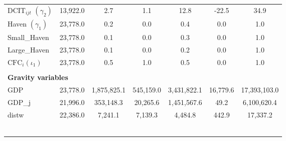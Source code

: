 \documentclass[twoside,a4paper,11pt]{article}
\begin{document}
\begin{minipage}{\linewidth}
{\begin{tabular}{lccc|ccc}
		$ \text{DCIT}_{ijt}$ $(\gamma_2)$ & 13,922.0 & 2.7 & 1.1 & 12.8 & -22.5 & 34.9 \\
		Haven $(\gamma_1)$ & 23,778.0 & 0.2 & 0.0 & 0.4 & 0.0 & 1.0 \\
		Small\_Haven & 23,778.0 & 0.1 & 0.0 & 0.3 & 0.0 & 1.0 \\
		Large\_Haven & 23,778.0 & 0.1 & 0.0 & 0.2 & 0.0 & 1.0 \\
		$\text{CFC}_i$$ (\iota_1)$ & 23,778.0 & 0.5 & 1.0 & 0.5 & 0.0 & 1.0 \\
		\vspace{2pt} & \begin{footnotesize}\end{footnotesize} & \begin{footnotesize}\end{footnotesize} & \begin{footnotesize}\end{footnotesize} & \begin{footnotesize}\end{footnotesize} & \begin{footnotesize}\end{footnotesize} & \begin{footnotesize}\end{footnotesize} \\
\multicolumn{7}{l}{\textbf{Gravity variables}} \\\hline
		GDP & 23,778.0 & 1,875,825.1 & 545,159.0 & 3,431,822.1 & 16,779.6 & 17,393,103.0 \\
		GDP\_j & 21,996.0 & 353,148.3 & 20,265.6 & 1,451,567.6 & 49.2 & 6,100,620.4 \\
		distw & 22,386.0 & 7,241.1 & 7,139.3 & 4,484.8 & 442.9 & 17,337.2 \\
		\vspace{2pt} & \begin{footnotesize}\end{footnotesize} & \begin{footnotesize}\end{footnotesize} & \begin{footnotesize}\end{footnotesize} & \begin{footnotesize}\end{footnotesize} & \begin{footnotesize}\end{footnotesize} & \begin{footnotesize}\end{footnotesize} \\
$$
\end{tabular}}
\end{minipage}
\end{document}
